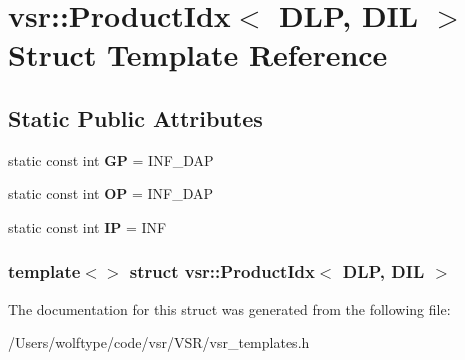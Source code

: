 \hypertarget{structvsr_1_1_product_idx_3_01_d_l_p_00_01_d_i_l_01_4}{\section{vsr\-:\-:Product\-Idx$<$ D\-L\-P, D\-I\-L $>$ Struct Template Reference}
\label{structvsr_1_1_product_idx_3_01_d_l_p_00_01_d_i_l_01_4}
}
\subsection*{Static Public Attributes}
\begin{DoxyCompactItemize}
\item 
\hypertarget{structvsr_1_1_product_idx_3_01_d_l_p_00_01_d_i_l_01_4_ac9fee91a3fa5a488790f4d7a491ec0ba}{static const int {\bfseries G\-P} = I\-N\-F\-\_\-\-D\-A\-P}\label{structvsr_1_1_product_idx_3_01_d_l_p_00_01_d_i_l_01_4_ac9fee91a3fa5a488790f4d7a491ec0ba}

\item 
\hypertarget{structvsr_1_1_product_idx_3_01_d_l_p_00_01_d_i_l_01_4_a7ef96348cb7648bd46b3e16fc03ec4cd}{static const int {\bfseries O\-P} = I\-N\-F\-\_\-\-D\-A\-P}\label{structvsr_1_1_product_idx_3_01_d_l_p_00_01_d_i_l_01_4_a7ef96348cb7648bd46b3e16fc03ec4cd}

\item 
\hypertarget{structvsr_1_1_product_idx_3_01_d_l_p_00_01_d_i_l_01_4_a7c545993d66a3512b81a89835576637a}{static const int {\bfseries I\-P} = I\-N\-F}\label{structvsr_1_1_product_idx_3_01_d_l_p_00_01_d_i_l_01_4_a7c545993d66a3512b81a89835576637a}

\end{DoxyCompactItemize}
\subsubsection*{template$<$$>$ struct vsr\-::\-Product\-Idx$<$ D\-L\-P, D\-I\-L $>$}



The documentation for this struct was generated from the following file\-:\begin{DoxyCompactItemize}
\item 
/\-Users/wolftype/code/vsr/\-V\-S\-R/vsr\-\_\-templates.\-h\end{DoxyCompactItemize}
